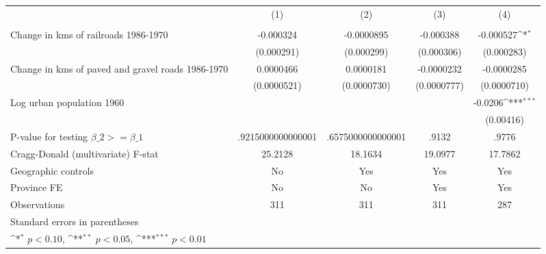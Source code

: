 {
\def\sym#1{\ifmmode^{#1}\else\(^{#1}\)\fi}
\begin{tabular}{l*{4}{c}}
\hline\hline
                &\multicolumn{1}{c}{(1)}&\multicolumn{1}{c}{(2)}&\multicolumn{1}{c}{(3)}&\multicolumn{1}{c}{(4)}\\
                &\multicolumn{1}{c}{}&\multicolumn{1}{c}{}&\multicolumn{1}{c}{}&\multicolumn{1}{c}{}\\
\hline
Change in kms of railroads 1986-1970&-0.000324         &-0.0000895         &-0.000388         &-0.000527\sym{*}  \\
                &(0.000291)         &(0.000299)         &(0.000306)         &(0.000283)         \\
[1em]
Change in kms of paved and gravel roads 1986-1970&0.0000466         &0.0000181         &-0.0000232         &-0.0000285         \\
                &(0.0000521)         &(0.0000730)         &(0.0000777)         &(0.0000710)         \\
[1em]
Log urban population 1960&                  &                  &                  &  -0.0206\sym{***}\\
                &                  &                  &                  &(0.00416)         \\
\hline
P-value for testing $\beta\_{2} >= \beta\_{1}$&.9215000000000001         &.6575000000000001         &    .9132         &    .9776         \\
Cragg-Donald (multivariate) F-stat&  25.2128         &  18.1634         &  19.0977         &  17.7862         \\
Geographic controls&       No         &      Yes         &      Yes         &      Yes         \\
Province FE     &       No         &       No         &      Yes         &      Yes         \\
Observations    &      311         &      311         &      311         &      287         \\
\hline\hline
\multicolumn{5}{l}{\footnotesize Standard errors in parentheses}\\
\multicolumn{5}{l}{\footnotesize \sym{*} \(p<0.10\), \sym{**} \(p<0.05\), \sym{***} \(p<0.01\)}\\
\end{tabular}
}
